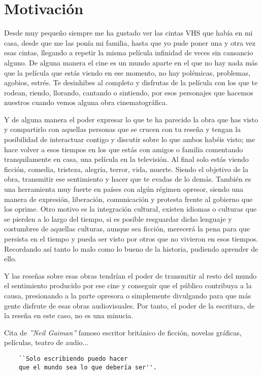 \section{Motivación}

Desde muy pequeño siempre me ha gustado ver las cintas VHS que había en mi casa, desde que me las ponía 
mi familia, hasta que yo pude poner una y otra vez esas cintas, llegando a repetir la misma película 
infinidad de veces sin cansancio alguno. De alguna manera el cine es un mundo aparte en el que no hay 
nada más que la película que estás viendo en ese momento, no hay polémicas, problemas, agobios, estrés. 
Te desinhibes al completo y disfrutas de la película con los que te rodean, riendo, llorando, cantando 
o sintiendo, por esos personajes que hacemos nuestros cuando vemos alguna obra cinematográfica. 

Y de alguna manera el poder expresar lo que te ha parecido la obra que has visto y compartirlo con 
aquellas personas que se crucen con tu reseña y tengan la posibilidad de interactuar contigo y discutir 
sobre lo que ambos habéis visto; me hace volver a esos tiempos en los que estás con amigos o familia 
comentando tranquilamente en casa, una película en la televisión. Al final solo estás viendo ficción, 
comedia, tristeza, alegría, terror, vida, muerte. Siendo el objetivo de la obra, transmitir ese 
sentimiento y hacer que te evadas de lo demás. También es una herramienta muy fuerte en países con 
algún régimen opresor, siendo una manera de expresión, liberación, comunicación y protesta frente al 
gobierno que los oprime. Otro motivo es la integración cultural, existen idiomas o culturas que se 
pierden a lo largo del tiempo, si es posible resguardar dicho lenguaje y costumbres de aquellas 
culturas, aunque sea ficción, merecerá la pena para que persista en el tiempo y pueda ser visto por 
otros que no vivieron en esos tiempos. Recordando así tanto lo malo como lo bueno de la historia, 
pudiendo aprender de ello.

Y las reseñas sobre esas obras tendrían el poder de transmitir al resto del mundo el sentimiento 
producido por ese cine y conseguir que el público contribuya a la causa, presionando a la parte 
opresora o simplemente divulgando para que más gente disfrute de esas obras audiovisuales. Por tanto, 
el poder de la escritura, de la reseña en este caso, no es una minucia.


Cita de \textit{''Neil Gaiman''}\cite{NeilG} famoso escritor británico de ficción, novelas gráficas,
películas, teatro de audio...
\begin{verbatim}
    ``Solo escribiendo puedo hacer 
    que el mundo sea lo que debería ser''.
\end{verbatim}

